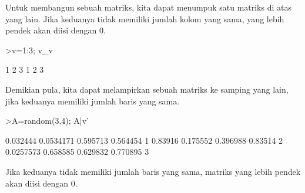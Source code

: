 \documentclass[12pt,arial,letterpaper]{book}
\begin{document}
\begin{eulercomment}
\begin{eulercomment}
\begin{eulercomment}
\begin{eulercomment}
\begin{eulercomment}
Untuk membangun sebuah matriks, kita dapat menumpuk satu matriks di
atas yang lain. Jika keduanya tidak memiliki jumlah kolom yang sama,
yang lebih pendek akan diisi dengan 0.
\end{eulercomment}
\begin{eulerprompt}
>v=1:3; v_v
\end{eulerprompt}
\begin{euleroutput}
              1             2             3 
              1             2             3 
\end{euleroutput}
\begin{eulercomment}
Demikian pula, kita dapat melampirkan sebuah matriks ke samping yang
lain, jika keduanya memiliki jumlah baris yang sama.
\end{eulercomment}
\begin{eulerprompt}
>A=random(3,4); A|v'
\end{eulerprompt}
\begin{euleroutput}
       0.032444     0.0534171      0.595713      0.564454             1 
        0.83916      0.175552      0.396988       0.83514             2 
      0.0257573      0.658585      0.629832      0.770895             3 
\end{euleroutput}
\begin{eulercomment}
Jika keduanya tidak memiliki jumlah baris yang sama, matriks yang
lebih pendek akan diisi dengan 0.


\end{eulercomment}
\end{eulercomment}
\end{eulercomment}
\end{eulercomment}
\end{eulercomment}
\end{document}

